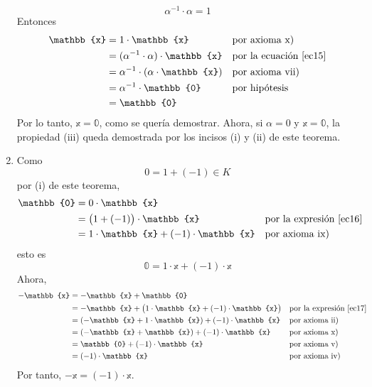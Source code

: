 \begin{theorem}{}{}
\begin{enumerate}[label=\roman*., topsep=6pt, itemsep=0pt]
        \begin{equation}
            \alpha^{-1} \cdot \alpha = 1 \label{ec15}
        \end{equation}
        Entonces
        \begin{align*}
            \mathbb{x} & = 1 \cdot \mathbb{x} && \text{por axioma x)} \\
            & = (\alpha^{-1} \cdot \alpha) \cdot \mathbb{x} && \text{por la ecuación \eqref{ec15}} \\
            & = \alpha^{-1} \cdot (\alpha \cdot \mathbb{x}) && \text{por axioma vii)} \\
            & = \alpha^{-1} \cdot \mathbb{0} && \text{por hipótesis} \\
            & = \mathbb{0}
        \end{align*}
        Por lo tanto, $\mathbb{x} = \mathbb{0}$, como se quería demostrar. Ahora, si $\alpha = 0$ y $\mathbb{x} = \mathbb{0}$, la propiedad (iii) queda demostrada por los incisos (i) y (ii) de este teorema.
        \item Como
        \begin{equation}
            0 = 1 + (-1) \in K \label{ec16}
        \end{equation}
        por (i) de este teorema,
        \begin{align*}
            \mathbb{0} & = 0 \cdot \mathbb{x} \\
            & = \big( 1 + (-1) \big) \cdot \mathbb{x} && \text{por la expresión \eqref{ec16}} \\
            & = 1 \cdot \mathbb{x} +  (-1) \cdot \mathbb{x} && \text{por axioma ix)}
        \end{align*}
        esto es
        \begin{equation}
            \mathbb{0} = 1 \cdot \mathbb{x} + (-1) \cdot \mathbb{x} \label{ec17}
        \end{equation}
        Ahora,
        \begin{align*}
            -\mathbb{x} & = - \mathbb{x} + \mathbb{0} \\
            & = -\mathbb{x} + \big( 1 \cdot \mathbb{x} + (-1) \cdot \mathbb{x} \big) && \text{por la expresión \eqref{ec17}} \\
            & = (-\mathbb{x} + 1 \cdot \mathbb{x}) + (-1) \cdot \mathbb{x} && \text{por axioma ii)} \\
            & = (-\mathbb{x} + \mathbb{x}) + (-1) \cdot \mathbb{x} && \text{por axioma x)} \\
            & = \mathbb{0} + (-1) \cdot \mathbb{x} && \text{por axioma v)} \\
            & = (-1) \cdot \mathbb{x} && \text{por axioma iv)}
        \end{align*}
        Por tanto, $-\mathbb{x} = (-1) \cdot \mathbb{x}$.
    \end{enumerate}
\end{theorem}

